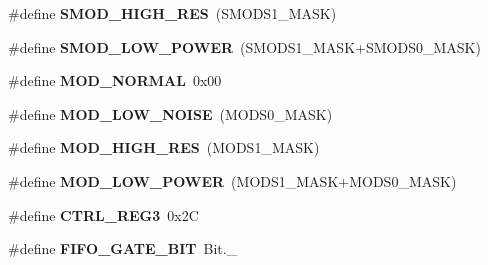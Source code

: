 \begin{DoxyCompactItemize}
\item 
\hypertarget{group___engduino_accelerometer_gacf792e6d35df99ae65a600fdb81ae3e4}{}\#define {\bfseries S\+M\+O\+D\+\_\+\+H\+I\+G\+H\+\_\+\+R\+E\+S}~(S\+M\+O\+D\+S1\+\_\+\+M\+A\+S\+K)\label{group___engduino_accelerometer_gacf792e6d35df99ae65a600fdb81ae3e4}

\item 
\hypertarget{group___engduino_accelerometer_gac2b8618ac13355ec2260ed6842146eda}{}\#define {\bfseries S\+M\+O\+D\+\_\+\+L\+O\+W\+\_\+\+P\+O\+W\+E\+R}~(S\+M\+O\+D\+S1\+\_\+\+M\+A\+S\+K+S\+M\+O\+D\+S0\+\_\+\+M\+A\+S\+K)\label{group___engduino_accelerometer_gac2b8618ac13355ec2260ed6842146eda}

\item 
\hypertarget{group___engduino_accelerometer_ga6a99a6e750261e5db7d6134f35292278}{}\#define {\bfseries M\+O\+D\+\_\+\+N\+O\+R\+M\+A\+L}~0x00\label{group___engduino_accelerometer_ga6a99a6e750261e5db7d6134f35292278}

\item 
\hypertarget{group___engduino_accelerometer_ga4576a456349e999e6a42b2b735b14295}{}\#define {\bfseries M\+O\+D\+\_\+\+L\+O\+W\+\_\+\+N\+O\+I\+S\+E}~(M\+O\+D\+S0\+\_\+\+M\+A\+S\+K)\label{group___engduino_accelerometer_ga4576a456349e999e6a42b2b735b14295}

\item 
\hypertarget{group___engduino_accelerometer_ga751788e9582caece3ab0144b63e02224}{}\#define {\bfseries M\+O\+D\+\_\+\+H\+I\+G\+H\+\_\+\+R\+E\+S}~(M\+O\+D\+S1\+\_\+\+M\+A\+S\+K)\label{group___engduino_accelerometer_ga751788e9582caece3ab0144b63e02224}

\item 
\hypertarget{group___engduino_accelerometer_ga712a90a55b7f1f57c8d60e03feee6698}{}\#define {\bfseries M\+O\+D\+\_\+\+L\+O\+W\+\_\+\+P\+O\+W\+E\+R}~(M\+O\+D\+S1\+\_\+\+M\+A\+S\+K+M\+O\+D\+S0\+\_\+\+M\+A\+S\+K)\label{group___engduino_accelerometer_ga712a90a55b7f1f57c8d60e03feee6698}

\item 
\hypertarget{group___engduino_accelerometer_gacdb673970b82f2380da68c9e8d1dc5c6}{}\#define {\bfseries C\+T\+R\+L\+\_\+\+R\+E\+G3}~0x2\+C\label{group___engduino_accelerometer_gacdb673970b82f2380da68c9e8d1dc5c6}

\item 
\hypertarget{group___engduino_accelerometer_ga742294c5302c975e48a568ff12352e4e}{}\#define {\bfseries F\+I\+F\+O\+\_\+\+G\+A\+T\+E\+\_\+\+B\+I\+T}~Bit.\+\_\label{group___engduino_accelerometer_ga742294c5302c975e48a568ff12352e4e}


\end{DoxyCompactItemize}
